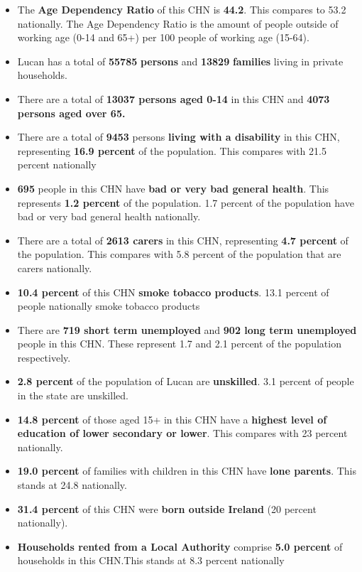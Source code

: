 \documentclass{article}
\begin{document}
\begin{itemize}

\item The \textbf{Age Dependency Ratio} of this CHN is  \textbf{44.2}. This compares to 53.2 nationally. The Age Dependency Ratio is the amount of people outside of working age (0-14 and 65+) per 100 people of working age (15-64). 

\item Lucan has a total of \textbf{\num{55785}} \textbf{persons} and  \textbf{\num{13829}} \textbf{families} living in private households.

\item There are a total of \textbf{\num{13037} persons aged 0-14} in this CHN and \textbf{\num{4073} persons aged over 65.} 

\item There are a total of \textbf{\num{9453}} persons \textbf{living with a disability} in this CHN, representing \textbf{16.9 percent} of the population. This compares with  21.5 percent nationally

\item \textbf{\num{695}} people in this CHN have \textbf{bad or very bad general health}. This represents \textbf{1.2 percent} of the population. 1.7 percent of the population have bad or very bad general health nationally. 

\item There are a total of \textbf{\num{2613} carers} in this CHN, representing \textbf{4.7 percent} of the population. This compares with 5.8 percent of the population that are carers nationally. 

\item \textbf{10.4 percent} of this CHN \textbf{smoke tobacco products}. 13.1 percent of people nationally smoke tobacco products

\item There are \textbf{\num{719} short term unemployed} and \textbf{\num{902} long term unemployed} people in this CHN. These represent 1.7 and 2.1 percent of the population respectively.

\item  \textbf{2.8 percent} of the population of Lucan are \textbf{unskilled}. 3.1 percent of people in the state are unskilled.

\item \textbf{14.8 percent} of those aged 15+ in this CHN have a \textbf{highest level of education of lower secondary or lower}. This compares with 23 percent nationally. 

\item \textbf{19.0 percent} of families with children in this CHN have \textbf{lone parents}. This stands at 24.8 nationally.

\item \textbf{31.4 percent} of this CHN were \textbf{born outside Ireland} (20 percent nationally).

\item \textbf{Households rented from a Local Authority} comprise \textbf{5.0 percent} of households in this CHN.This stands at 8.3 percent nationally

\end{itemize}
\end{document}
